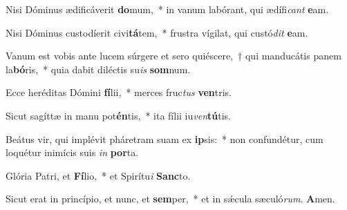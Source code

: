 \item Nisi Dóminus ædificáverit \textbf{do}mum,~* in vanum labórant, qui ædífi\textit{cant} \textbf{e}am.

\item Nisi Dóminus custodíerit civi\textbf{tá}tem,~* frustra vígilat, qui custó\textit{dit} \textbf{e}am.

\item Vanum est vobis ante lucem súrgere et sero quiéscere,~† qui manducátis panem la\textbf{bó}ris,~* quia dabit diléctis su\textit{is} \textbf{som}num.

\item Ecce heréditas Dómini \textbf{fí}lii,~* merces fruc\textit{tus} \textbf{ven}tris.

\item Sicut sagíttæ in manu pot\textbf{én}tis,~* ita fílii iu\textit{ven}\textbf{tú}tis.

\item Beátus vir, qui implévit pháretram suam ex \textbf{ip}sis:~* non confundétur, cum loquétur inimícis suis \textit{in} \textbf{por}ta.

\item Glória Patri, et \textbf{Fí}lio,~* et Spirítu\textit{i} \textbf{Sanc}to.

\item Sicut erat in princípio, et nunc, et \textbf{sem}per,~* et in sǽcula sæculó\textit{rum}. \textbf{A}men.